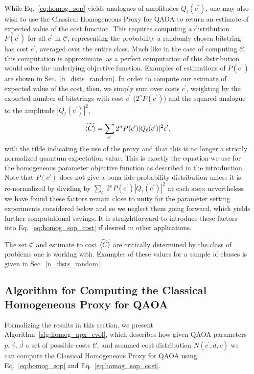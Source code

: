 \documentclass[superscriptaddress,pra,aps,10pt,longbibliography,notitlepage]{revtex4-1}
\newcommand*\cp{c^\prime}
\begin{document}
While Eq.~\eqref{eq:homog_sop} yields analogues of amplitudes $Q_{\ell}(\cp)$, one may also wish to use the Classical Homogeneous Proxy for QAOA to return an estimate of expected value of the cost function. This requires computing a distribution $P(\cp)$ for all $\cp$ in $\mathcal{C}$, representing the probability a randomly chosen bitstring has cost $\cp$, averaged over the entire class. Much like in the case of computing $\mathcal{C}$, this computation is approximate, as a perfect computation of this distribution would solve the underlying objective function. Examples of estimations of $P(\cp)$ are shown in Sec.~\ref{n_dists_random}. In order to compute our estimate of expected value of the cost, then, we simply sum over costs $\cp$, weighting by the expected number of bitstrings with cost $\cp$ ($2^n P(\cp)$) and the squared analogue to the amplitude $|Q_{\ell}(\cp)|^2$,

\begin{equation}\label{eq:homog_sop_cost}
\widetilde{\braket{C}}= \sum_{\cp}  2^n P(\cp)|Q_{\ell}(\cp)|^2 \cp,
\end{equation}
with the tilde indicating the use of the proxy and that this is no longer a strictly normalized quantum expectation value. This is exactly the equation we use for the homogeneous parameter objective function as described in the introduction. Note that $P(c')$ does not give a bona fide probability distribution unless it is re-normalized by dividing by $\sum_{\cp}  2^n P(\cp)|Q_{\ell}(\cp)|^2$ at each step; nevertheless we have found these factors remain close to unity for the parameter setting experiments considered below and so we neglect them going forward, which yields further computational savings. It is straightforward to introduce these factors into Eq.~\ref{eq:homog_sop_cost} if desired in other applications.

The set $\mathcal{C}$ and estimate to cost $\widetilde{\braket{C}}$ are critically determined by the class of problems one is working with. Examples of these values for a sample of classes is given in Sec.~\ref{n_dists_random}. 


\subsection{Algorithm for Computing the Classical Homogeneous Proxy for QAOA}

Formalizing the results in this section, we present Algorithm~\ref{alg:homog_apx_evol}, which describes how given QAOA parameters $p,\vec{\gamma},\vec{\beta}$ a set of possible costs $\mathcal{C}$, and assumed cost distribution $N(\cp;d,c)$ we can compute the Classical Homogeneous Proxy for QAOA using Eq.~\eqref{eq:homog_sop} and Eq.~\ref{eq:homog_sop_cost}.
\vspace{2mm}
\end{document}
